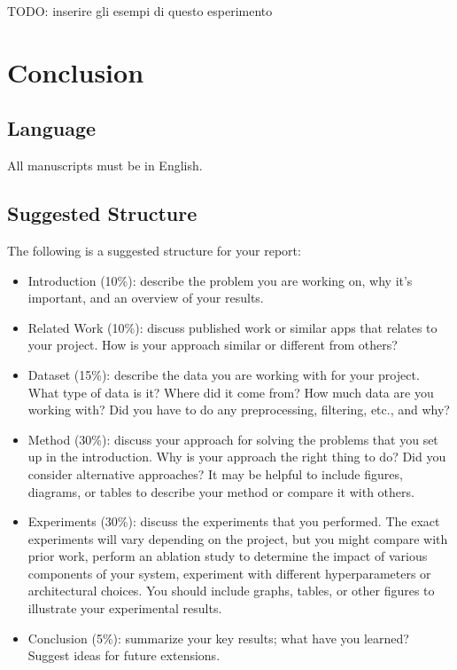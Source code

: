 \documentclass[10pt,twocolumn,letterpaper]{article}
\begin{document}
TODO: inserire gli esempi di questo esperimento

\section{Conclusion}


\subsection{Language}

All manuscripts must be in English.

\subsection{Suggested Structure}

The following is a suggested structure for your report:

\begin{itemize}
	\item Introduction (10\%): describe the problem you are working on, why it's important, and an overview of your results.
	\item Related Work (10\%): discuss published work or similar apps that relates to your project. How is your approach similar or different from others?
	\item Dataset (15\%): describe the data you are working with for your project. What type of data is it? Where did it come from? How much data are you working with? Did you have to do any preprocessing, filtering, etc., and why?
	\item Method (30\%): discuss your approach for solving the problems that you set up in the introduction. Why is your approach the right thing to do? Did you consider alternative approaches? It may be helpful to include figures, diagrams, or tables to describe your method or compare it with others.
	\item Experiments (30\%): discuss the experiments that you performed. The exact experiments will vary depending on the project, but you might compare with prior work, perform an ablation study to determine the impact of various components of your system, experiment with different hyperparameters or architectural choices. You should include graphs, tables, or other figures to illustrate your experimental results.
	\item Conclusion (5\%): summarize your key results; what have you learned? Suggest ideas for future extensions.
\end{itemize}	
\end{document}

